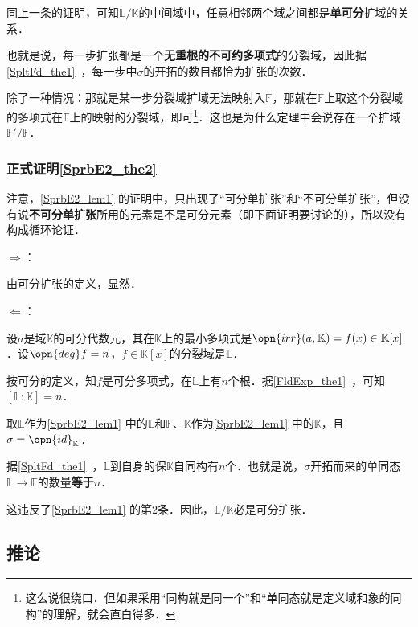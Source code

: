 同上一条的证明，可知$\mathbb{L}/\mathbb{K}$的中间域中，任意相邻两个域之间都是\textbf{单可分}扩域的关系．

也就是说，每一步扩张都是一个\textbf{无重根的不可约多项式}的分裂域，因此据\autoref{SpltFd_the1}~，每一步中$\sigma$的开拓的数目都恰为扩张的次数．

除了一种情况：那就是某一步分裂域扩域无法映射入$\mathbb{F}$，那就在$\mathbb{F}$上取这个分裂域的多项式在$\mathbb{F}$上的映射的分裂域，即可\footnote{这么说很绕口．但如果采用“同构就是同一个”和“单同态就是定义域和象的同构”的理解，就会直白得多．}．这也是为什么定理中会说存在一个扩域$\mathbb{F}'/\mathbb{F}$．




\subsubsection{正式证明\autoref{SprbE2_the2} }

注意，\autoref{SprbE2_lem1} 的证明中，只出现了“可分单扩张”和“不可分单扩张”，但没有说\textbf{不可分单扩张}所用的元素是不是可分元素（即下面证明要讨论的），所以没有构成循环论证．

$\Rightarrow$：

由可分扩张的定义，显然．

$\Leftarrow$：

设$a$是域$\mathbb{K}$的可分代数元，其在$\mathbb{K}$上的最小多项式是$\opn{irr}(a, \mathbb{K})=f(x)\in\mathbb{K}[x]$．设$\opn{deg}f=n$，$f\in\mathbb{K}[x]$的分裂域是$\mathbb{L}$．

按可分的定义，知$f$是可分多项式，在$\mathbb{L}$上有$n$个根．据\autoref{FldExp_the1}~，可知$[\mathbb{L}:\mathbb{K}]=n$．

取$\mathbb{L}$作为\autoref{SprbE2_lem1} 中的$\mathbb{L}$和$\mathbb{F}$、$\mathbb{K}$作为\autoref{SprbE2_lem1} 中的$\mathbb{K}$，且$\sigma=\opn{id}_{\mathbb{K}}$．

据\autoref{SpltFd_the1}~，$\mathbb{L}$到自身的保$\mathbb{K}$自同构有$n$个．也就是说，$\sigma$开拓而来的单同态$\mathbb{L}\to\mathbb{F}$的数量\textbf{等于}$n$．

这违反了\autoref{SprbE2_lem1} 的第$2$条．因此，$\mathbb{L}/\mathbb{K}$必是可分扩张．



\subsection{推论}



